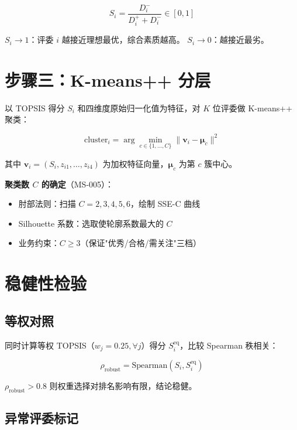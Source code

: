 \documentclass[UTF8]{ctexart}
\begin{document}
\begin{equation}
S_i = \frac{D_i^-}{D_i^+ + D_i^-} \in [0, 1]
\end{equation}

$S_i \to 1$：评委 $i$ 越接近理想最优，综合素质越高。
$S_i \to 0$：越接近最劣。

\section{步骤三：K-means++ 分层}

以 TOPSIS 得分 $S_i$ 和四维度原始归一化值为特征，对 $K$ 位评委做 K-means++ 聚类：

\begin{equation}
\text{cluster}_i = \arg\min_{c \in \{1,\ldots,C\}} \| \mathbf{v}_i - \boldsymbol{\mu}_c \|^2
\end{equation}

其中 $\mathbf{v}_i = (S_i, z_{i1}, \ldots, z_{i4})$ 为加权特征向量，$\boldsymbol{\mu}_c$ 为第 $c$ 簇中心。

\textbf{聚类数 $C$ 的确定}（MS-005）：
\begin{itemize}
    \item 肘部法则：扫描 $C=2,3,4,5,6$，绘制 SSE-C 曲线
    \item Silhouette 系数：选取使轮廓系数最大的 $C$
    \item 业务约束：$C \geq 3$（保证"优秀/合格/需关注"三档）
\end{itemize}

\section{稳健性检验}

\subsection{等权对照}

同时计算等权 TOPSIS（$w_j = 0.25, \forall j$）得分 $S_i^{\text{eq}}$，比较 Spearman 秩相关：

\begin{equation}
\rho_{\text{robust}} = \text{Spearman}(S_i, S_i^{\text{eq}})
\end{equation}

$\rho_{\text{robust}} > 0.8$ 则权重选择对排名影响有限，结论稳健。

\subsection{异常评委标记}
\end{document}
